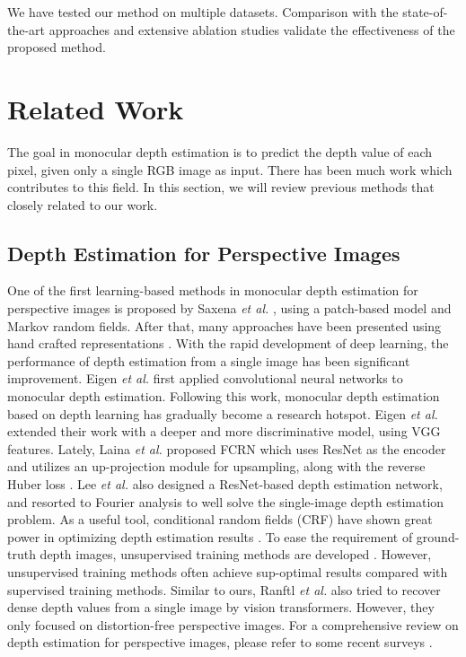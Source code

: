 \documentclass[10pt,twocolumn,letterpaper]{article}
\begin{document}
We have tested our method on multiple datasets. Comparison with the state-of-the-art approaches and extensive ablation studies validate the effectiveness of the proposed method.








\section{Related Work}
The goal in monocular depth estimation is to predict the depth value of each pixel, given only a single RGB image as input. There has been much work which contributes to this field. In this section, we will review previous methods that closely related to our work.

\subsection{Depth Estimation for Perspective Images}
One of the first learning-based methods in monocular depth estimation for perspective images is proposed by Saxena \emph{et al.} \cite{NIPS2005_17d8da81}, using a patch-based model and Markov random fields. After that, many approaches have been presented using hand crafted representations \cite{10518975,7780809,8237759}. With the rapid development of deep learning, the performance of depth estimation from a single image has been significant improvement. Eigen \emph{et al.} \cite{Eigen_2014_NIPS} first applied convolutional neural networks to monocular depth estimation. Following this work, monocular depth estimation based on depth learning has gradually become a research hotspot. Eigen \emph{et al.} \cite{Eigen_2015_ICCV} extended their work \cite{Eigen_2014_NIPS} with a deeper and more discriminative model, using VGG features. Lately, Laina \emph{et al.} \cite{Laina_2016_3DV} proposed FCRN which uses ResNet \cite{He_2016_CVPR} as the encoder and utilizes an up-projection module for upsampling, along with the reverse Huber loss \cite{RePEc:taf:gnstxx:v:28:y:2016:i:3:p:487-514}. Lee \emph{et al.} \cite{Lee_2018_CVPR} also designed a ResNet-based depth estimation network, and resorted to Fourier analysis to well solve the single-image depth estimation problem. As a useful tool, conditional random fields (CRF) have shown great power in optimizing depth estimation results \cite{Liu_2015_CVPR,Cao_2018_TCSVT,Wang_2015_CVPR,Xu_2018_CVPR}. To ease the requirement of ground-truth depth images, unsupervised training methods are developed \cite{Godard_2017_CVPR,Zhan_2018_CVPR,Zhou_2017_CVPR,Yin_2018_CVPR}. However, unsupervised training methods often achieve sup-optimal results compared with supervised training methods. Similar to ours, Ranftl \emph{et al.} \cite{Ranftl2021} also tried to recover dense depth values from a single image by vision transformers. However, they only focused on distortion-free perspective images.
For a comprehensive review on depth estimation for perspective images, please refer to some recent surveys \cite{DBLP:journals/corr/abs-1906-06113,s20082272,MING202114}.
\end{document}
